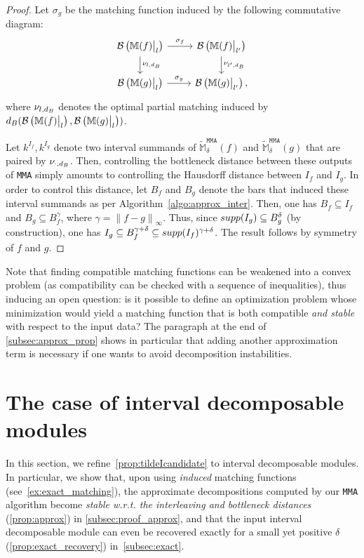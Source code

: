 \documentclass{article}
\newcommand{\norm}[1]{\left\lVert #1 \right\rVert}
\newcommand{\barcode}[1]{ {\mathcal B}\left(#1\right) }
\newcommand{\matching}{\sigma}
\newcommand{\Mbb}{\mathbb{M}}
\newcommand{\M}{{\mathbb M}}
\newcommand{\distb}{{d_{\rm B}}}
\newcommand{\supp}[1]{ {\rm supp}(#1) }
\newcommand\restr[2]{{  \left.\kern-\nulldelimiterspace #1 \vphantom{\big|} \right|_{#2}  }}
\newcommand{\MMA}{\texttt{MMA}}
\newcommand{\mMMA}{\mathtt{MMA}}
\newcommand{\mmaoutcompat}{approximate}
\newcommand{\rebuttal}[1]{{ #1}}
\begin{document}
\begin{proof}
	Let $\matching_g$ be the matching function induced by the following commutative diagram:
	\begin{equation}
		\begin{tikzcd}
			\barcode{\restr{\Mbb(f)}{l}}
			\arrow{r}{\sigma_{f}}
			\arrow{d}{\nu_{l,\distb}}
			&
			\barcode{\restr{\Mbb(f)}{l'}}
			\arrow{d}{\nu_{l',\distb}}
			\\
			\barcode{\restr{\Mbb(g)}{l}}
			\arrow{r}{\sigma_{g}}
			&
			\barcode{\restr{\Mbb(g)}{l'}},
		\end{tikzcd}
	\end{equation}
	where $\nu_{l,\distb}$ denotes the optimal partial matching induced by
	$\distb(\barcode{\restr{\Mbb(f)}{l}}, \barcode{\restr{\Mbb(g)}{l}})$.

	Let $k^{I_f},k^{I_g}$ denote two interval summands of $\tilde\M^{\mMMA{}}_\delta(f)$ and $\tilde\M^{\mMMA{}}_\delta(g)$ that are paired by $\nu_{\cdot,\distb}$. Then, controlling the bottleneck distance between these outputs of \MMA{} simply amounts to controlling the Hausdorff distance between ${I_f}$ and ${I_g}$.
	In order to control this distance, let $B_f$ and $B_g$ denote the bars that induced these interval summands as per Algorithm~\ref{algo:approx_inter}.
	Then, one has $B_f\subseteq {I_f}$ and $B_g\subseteq B_f^\gamma$, where $\gamma=\norm{f-g}_\infty$.
	Thus, since $\supp{I_g}\subseteq B_g^\delta$ (by construction), one has $I_g\subseteq B_f^{\gamma+\delta}\subseteq \supp{I_f}^{\gamma+\delta}$. The result follows by symmetry of $f$ and $g$.
\end{proof}
\rebuttal{
Note that finding compatible matching functions can be weakened into a convex problem (as compatibility can be checked with a sequence of inequalities),
thus inducing an open question: is it possible to define
an optimization problem whose minimization would yield a matching function
that is both compatible \emph{and stable}
with respect to the input data?
The paragraph at the end of \cref{subsec:approx_prop} shows in particular
that adding another approximation term is necessary if one wants to
avoid decomposition instabilities.
}



\section{\rebuttal{The case of interval decomposable modules}}
\label{sec:exact_algo}

In this section, we 
\rebuttal{refine~\cref{prop:tildeIcandidate} to
interval decomposable modules. In particular, we show that, upon using
{\em induced} matching functions (see~\cref{ex:exact_matching}), the 
\mmaoutcompat{} decompositions computed by our \MMA{} algorithm become
{\em stable w.r.t. the interleaving and bottleneck distances} (\cref{prop:approx})
in \cref{subsec:proof_approx},
and that the input interval decomposable module can even be recovered exactly 
for a small yet positive $\delta$ 
(\cref{prop:exact_recovery}) in~\cref{subsec:exact}.}
\end{document}
